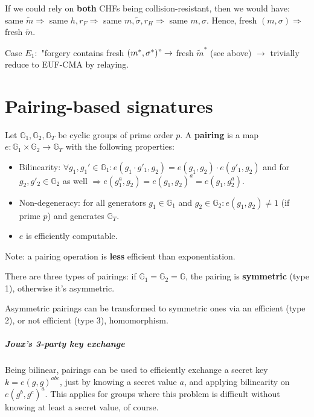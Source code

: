 \documentclass[oneside]{book}
\newcommand{\G}[0]{\mathbb{G}}
\begin{document}
If we could rely on \textbf{both} CHFs being collision-resistant, then we would have: same $\widetilde{m} \Rightarrow$ same $h, r_F \Rightarrow$ same $m, \widetilde{\sigma}, r_H \Rightarrow$ same $m, \sigma$. Hence, fresh $(m, \sigma) \Rightarrow$ fresh $\widetilde{m}$.

Case $E_1:$ "forgery contains fresh $(m^*, \sigma^*) " \rightarrow$ fresh $\widetilde{m}^*$ (see above) $\rightarrow$ trivially reduce to EUF-CMA by relaying.

\chapter{Pairing-based signatures}
Let $\G_1, \G_2, \G_T$ be cyclic groups of prime order $p$. A \textbf{pairing} is a map $e: \G_1 \times \G_2 \rightarrow \G_T$ with the following properties:
\begin{itemize}
    \item Bilinearity: $\forall g_1, g_1' \in \G_1: e(g_1 \cdot g'_1, g_2) = e(g_1, g_2) \cdot e(g'_1, g_2)$ and for $g_2, g'_2 \in \G_2$ as well $\Rightarrow e(g_1^a, g_2) = e(g_1, g_2)^a = e(g_1, g_2^a)$.
    \item Non-degeneracy: for all generators $g_1 \in \G_1$ and $g_2 \in \G_2: e(g_1, g_2) \neq 1$  (if prime $p$) and generates $\G_T$.
    \item $e$ is efficiently computable.
\end{itemize}

Note: a pairing operation is \textbf{less} efficient than exponentiation.

There are three types of pairings: if $\G_1 = \G_2 = \G$, the pairing is \textbf{symmetric} (type 1), otherwise it's asymmetric.

Asymmetric pairings can be transformed to symmetric ones via an efficient (type 2), or not efficient (type 3), homomorphism.

\paragraph{Joux's 3-party key exchange}
Being bilinear, pairings can be used to efficiently exchange a secret key $k = e(g,g)^{abc}$, just by knowing a secret value $a$, and applying bilinearity on $e(g^b, g^c)^a$. This applies for groups where this problem is difficult without knowing at least a secret value, of course.
\end{document}
